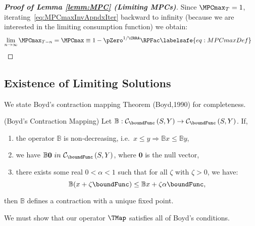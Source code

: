 \documentclass[\econtexRoot/BufferStockTheory]{subfiles}
\begin{document}
\begin{proof}[\textbf{Proof of Lemma \ref{lemm:MPC} (Limiting MPCs)}]
Since $\MPCmax_{T}=1$, iterating~\eqref{eq:MPCmaxInvApndxIter} backward to
infinity (because we are interested in the limiting consumption function) we obtain:
\begin{equation}\begin{gathered}\begin{aligned}
\lim_{n\rightarrow\infty}\MPCmax_{T-n} 
& = \MPCmax \equiv 1-\pZero^{1/\CRRA}\RPFac  \labelsafe{eq:MPCmaxDef}
\end{aligned}\end{gathered}\end{equation}




\end{proof}

\hypertarget{It-Is-A-Contraction-Mapping}{}
\subsection{Existence of Limiting Solutions}\label{sec:Tcontractionmapping}

We state Boyd's contraction mapping Theorem (Boyd,1990) for completeness.


\begin{theorem}(Boyd's Contraction Mapping)
Let $\mathbb{B}:\mathcal{C}_{\boundFunc }\left( S,Y\right)
  \rightarrow \mathcal{C}_{\boundFunc }\left(S,Y\right) $.
If, 
\begin{enumerate}
  \item the operator $\mathbb{B}$ is non-decreasing, i.e.\ ${x} \leq {y}\Rightarrow\mathbb{B}{x} \leq \mathbb{B}{y}$,
  \item we have $\mathbb{B}\mathbf{0}\ in ~ \mathcal{C}_{\boundFunc }\left(S,Y\right) $, where $\mathbf{0}$ is the null vector,
  \item there exists some real $0 < \alpha < 1$ such that for all $\zeta$ with $\zeta > 0$, we have:
             $$\mathbb{B}({x} +\zeta\boundFunc ) \leq \mathbb{B}{x} +\zeta\alpha \boundFunc,$$
\end{enumerate}
then $\mathbb{B}$ defines a contraction with a unique fixed point.
\end{theorem}

We must show that our operator $\TMap$ satisfies all of Boyd's
conditions.
\end{document}
